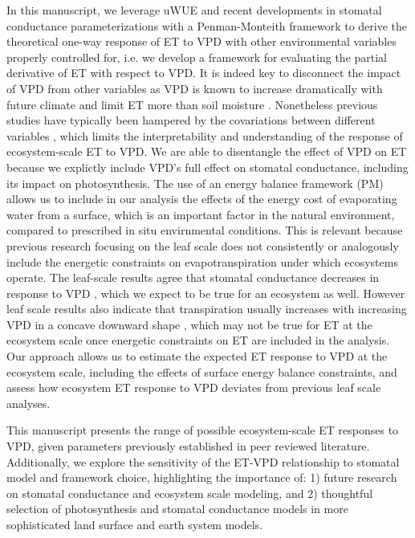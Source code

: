 In this manuscript, we leverage uWUE and recent developments in
stomatal conductance parameterizations \citep{MEDLYN_2011} with a
Penman-Monteith framework \citep [hereafter PM,][]{Penman_1948,
Monteith_1965} to derive the theoretical one-way response of ET to VPD
with other environmental variables properly controlled for, i.e. we
develop a framework for evaluating the partial derivative of ET with
respect to VPD. It is indeed key to disconnect the impact of VPD from
other variables as VPD is known to increase dramatically with future
climate and limit ET more than soil moisture
\citep{Novick_2016}. Nonetheless previous studies have typically been
hampered by the covariations between different variables
\citep[e.g. soil moisture and VPD, ][]{Lin_2018, Zhou_2019}, which
limits the interpretability and understanding of the response of
ecosystem-scale ET to VPD. We are able to disentangle the effect of
VPD on ET because we explictly include VPD's full effect on stomatal
conductance, including its impact on photosynthesis. The use of an
energy balance framework (PM) allows us to include in our analysis the
effects of the energy cost of evaporating water from a surface, which
is an important factor in the natural environment, compared to
prescribed in situ envirnmental conditions. This is relevant because
previous research focusing on the leaf scale \citep{Rawson1977,
Turner1984, Oren1999, Darmour2010, Mott2013} does not consistently or
analogously include the energetic constraints on evapotranspiration
under which ecosystems operate. The leaf-scale results agree that
stomatal conductance decreases in response to VPD \citep{Oren1990,
Damour2010}, which we expect to be true for an ecosystem as
well. However leaf scale results also indicate that transpiration
usually increases with increasing VPD in a concave downward shape
\citep[e.g.,][]{Rawson1977, Turner1983, Mott2013}, which may not be
true for ET at the ecosystem scale once energetic constraints on ET
are included in the analysis.  Our approach allows us to estimate the
expected ET response to VPD at the ecosystem scale, including the
effects of surface energy balance constraints, and assess how
ecosystem ET response to VPD deviates from previous leaf scale
analyses.

This manuscript presents the range of possible ecosystem-scale ET
responses to VPD, given parameters previously established in peer
reviewed literature. Additionally, we explore the sensitivity of the
ET-VPD relationship to stomatal model and framework choice,
highlighting the importance of: 1) future research on stomatal
conductance and ecosystem scale modeling, and 2) thoughtful selection
of photosynthesis and stomatal conductance models in more
sophisticated land surface and earth system models.
